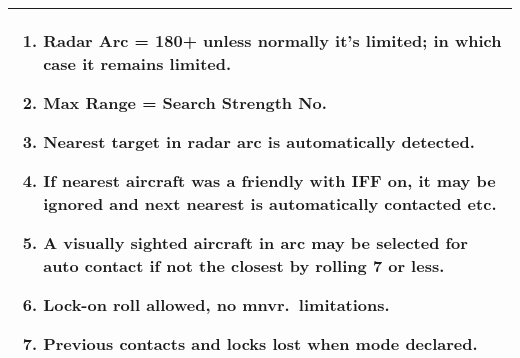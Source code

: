 \begin{onecolumntablefloat}
\begin{onecolumntable}
\begin{tabularx}{\linewidth}{X}
\toprule
\begin{enumerate}
    \item Radar Arc = 180+ unless normally it's limited; in which case it remains limited.
    \item Max Range = Search Strength No.
    \item Nearest target in radar arc is automatically detected.
    \item If nearest aircraft was a friendly with IFF on, it may be ignored and next nearest is automatically contacted etc.
    \item A visually sighted aircraft in arc may be selected for auto contact if not the closest by rolling 7 or less.
    \item Lock-on roll allowed, no mnvr.\ limitations.
    \item Previous contacts and locks lost when mode declared.
\end{enumerate}
\\
\bottomrule
\end{tabularx}
\end{onecolumntable}
\end{onecolumntablefloat}
